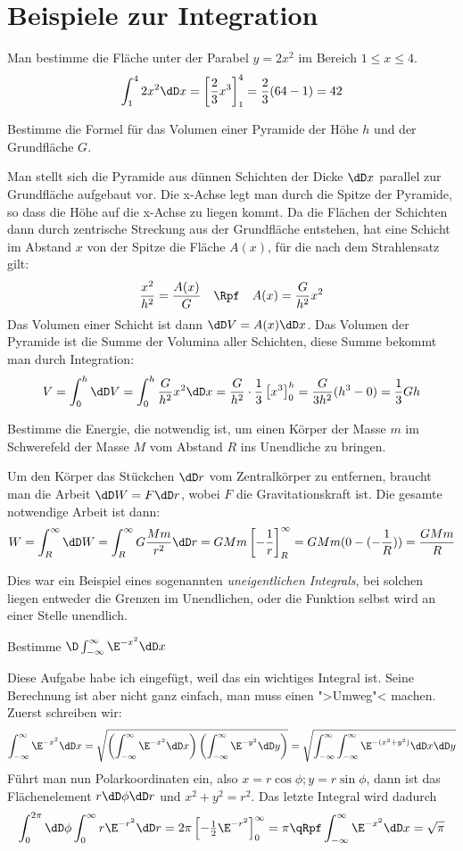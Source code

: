 \section{Beispiele zur Integration}
\NA Man bestimme die Fläche unter der Parabel $y=2x^2$ im Bereich $1\le x\le
4$.
\[
\int_1^4 2x^2\dD x=\left[\frac{2}{3}x^3\right]_1^4=\frac{2}{3}(64-1)=42
\]

\NA Bestimme die Formel für das Volumen einer Pyramide der Höhe $h$ und der
Grundfläche $G$.

Man stellt sich die Pyramide aus dünnen Schichten der Dicke $\dD x$ parallel
zur Grundfläche aufgebaut vor. Die x-Achse legt man durch die Spitze der
Pyramide, so dass die Höhe auf die x-Achse zu liegen kommt. Da die Flächen der
Schichten dann durch zentrische Streckung aus der Grundfläche entstehen, hat
eine Schicht im Abstand $x$ von der Spitze die Fläche $A(x)$, für die nach dem
Strahlensatz gilt:
\[
\frac{x^2}{h^2}=\frac{A(x)}{G}\quad\Rpf\quad A(x)=\frac{G}{h^2} x^2
\]
Das Volumen einer Schicht ist dann $\dD V=A(x)\dD x$. Das Volumen der Pyramide
ist die Summe der Volumina aller Schichten, diese Summe bekommt man durch
Integration:
\[
V=\int_0^h \dD V=\int_0^h \frac{G}{h^2}x^2\dD x
=\frac{G}{h^2}\cdot\frac{1}{3}\left[x^3\right]_0^h=
\frac{G}{3h^2}(h^3-0)=\frac{1}{3}Gh
\]

\NA Bestimme die Energie, die notwendig ist, um einen Körper der Masse $m$ im
Schwerefeld der Masse $M$ vom Abstand $R$ ins Unendliche zu bringen.

Um den Körper das Stückchen $\dD r$ vom Zentralkörper zu entfernen, braucht
man die Arbeit $\dD W=F\dD r$, wobei $F$ die Gravitationskraft ist. Die gesamte
notwendige Arbeit ist dann:
\[
W=\int_R^{\infty}\dD W=\int_R^{\infty}G\frac{Mm}{r^2}\dD r=
GMm\left[-\frac{1}{r}\right]_R^{\infty}=GMm(0-(-\frac{1}{R}))=\frac{GMm}{R}
\]

Dies war ein Beispiel eines sogenannten \emph{uneigentlichen Integrals}, bei
solchen liegen entweder die Grenzen im Unendlichen, oder die Funktion selbst
wird an einer Stelle unendlich.

\NA Bestimme $ \D\int_{-\infty}^{\infty}\E^{-x^2}\dD x$

Diese Aufgabe habe ich eingefügt, weil das ein wichtiges Integral ist. Seine
Berechnung ist aber nicht ganz einfach, man muss einen ">Umweg"< machen.
Zuerst schreiben wir:
\[
\int_{-\infty}^{\infty}\E^{-x^2}\dD x=
\sqrt{\left(\int_{-\infty}^{\infty}\E^{-x^2}\dD x\right)
  \left(\int_{-\infty}^{\infty}\E^{-y^2}\dD y\right)}=
\sqrt{\int_{-\infty}^{\infty}\int_{-\infty}^{\infty}
    \E^{-(x^2+y^2)}\dD x\dD y}
\]
Führt man nun Polarkoordinaten ein, also $x=r\cos\phi; y=r\sin\phi$, dann ist
das Flächenelement $r\dD\phi\dD r$ und $x^2+y^2=r^2$. Das letzte Integral wird
dadurch
\[
\int_0^{2\pi}\dD\phi\int_0^{\infty}r\E^{-r^2}\dD r
=2\pi\left[-\tfrac12\E^{-r^2}\right]_0^{\infty}=\pi \qRpf
\int_{-\infty}^{\infty}\E^{-x^2}\dD x=\sqrt{\pi}
\]

